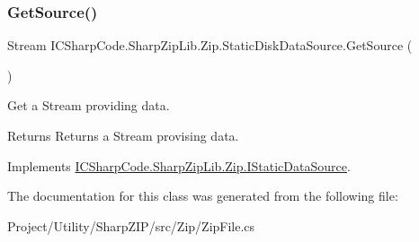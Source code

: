 \subsubsection{\texorpdfstring{Get\+Source()}{GetSource()}}
{\footnotesize\ttfamily Stream I\+C\+Sharp\+Code.\+Sharp\+Zip\+Lib.\+Zip.\+Static\+Disk\+Data\+Source.\+Get\+Source (\begin{DoxyParamCaption}{ }\end{DoxyParamCaption})\hspace{0.3cm}{\ttfamily [inline]}}



Get a Stream providing data. 

\begin{DoxyReturn}{Returns}
Returns a Stream provising data.
\end{DoxyReturn}


Implements \hyperlink{interface_i_c_sharp_code_1_1_sharp_zip_lib_1_1_zip_1_1_i_static_data_source_a9f27e7ccbb6a231d3836ba1e09631733}{I\+C\+Sharp\+Code.\+Sharp\+Zip\+Lib.\+Zip.\+I\+Static\+Data\+Source}.



The documentation for this class was generated from the following file\+:\begin{DoxyCompactItemize}
\item 
Project/\+Utility/\+Sharp\+Z\+I\+P/src/\+Zip/Zip\+File.\+cs\end{DoxyCompactItemize}
